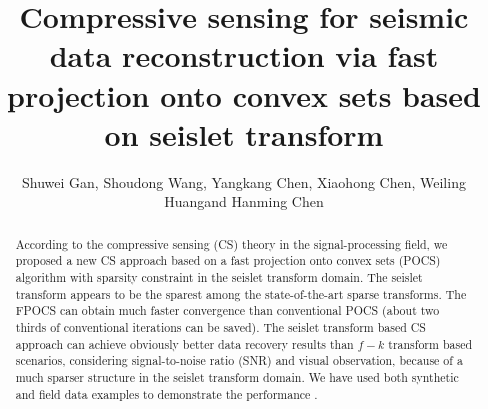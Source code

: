 
\title{Compressive sensing for seismic data reconstruction via fast projection onto convex sets based on seislet transform}
\renewcommand{\thefootnote}{\fnsymbol{footnote}}
\author{Shuwei Gan\footnotemark[1], Shoudong Wang\footnotemark[1], Yangkang Chen\footnotemark[2], Xiaohong Chen\footnotemark[1], Weiling Huang\footnotemark[1] and Hanming Chen\footnotemark[1]}
\address{
\footnotemark[1] State Key Laboratory of Petroleum Resources and Prospecting \\
China University of Petroleum \\
Fuxue Road 18th\\
Beijing, China, 102200 \\
Email: gsw19900128@126.com\&swang104@ucsc.edu\&chenxh@cup.edu.cn \\
cup\_hwl@126.com \& huichanming@126.com \\
\footnotemark[2] Jackson School of Geosciences\\
The University of Texas at Austin\\
University Station, Box X\\
Austin, TX 78713-8924, USA \\
Email: ykchen@utexas.edu
}

\maketitle

\begin{abstract}
According to the compressive sensing (CS) theory in the signal-processing field, we proposed a new CS approach based on a fast projection onto convex sets (POCS) algorithm with sparsity constraint in the seislet transform domain. The seislet transform appears to be the sparest among the state-of-the-art sparse transforms. The FPOCS can obtain much faster convergence than conventional POCS (about two thirds of conventional iterations can be saved).  The seislet transform based CS approach can achieve obviously better data recovery results than $f-k$ transform based scenarios, considering  signal-to-noise ratio (SNR) and visual observation, because of a much sparser structure in the seislet transform domain. We have used both synthetic and field data examples to demonstrate the  performance . 
\end{abstract}



